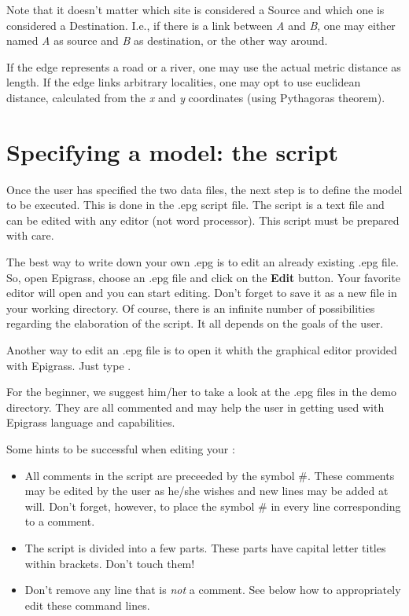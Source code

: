 \documentclass[a4paper,10pt]{manual}
\begin{document}
Note that it doesn't matter which site is considered a Source and which one is considered a Destination. I.e., if there is a link between \emph{A} and \emph{B}, one may either named \emph{A} as source and \emph{B} as destination, or the other way around.

If the edge represents a road or a river, one may use the actual metric distance as length. If the edge links arbitrary localities, one may opt to use euclidean distance, calculated from the \emph{x} and \emph{y} coordinates (using Pythagoras theorem).


\section{Specifying a model: the script}

Once the user has specified the two data files, the next step is to define the model to be executed. This is done in the .epg script file. The    script is a text file and can be edited with any editor (not word processor). This script must be prepared with care.

The best way to write down your own .epg is to edit an already existing .epg file. So, open Epigrass, choose an .epg file and click on the \textbf{Edit} button. Your favorite editor will open and you can start editing. Don't forget to save it as a new file in your working directory. Of course, there is an infinite number of possibilities regarding the elaboration of the script. It all depends on the goals of the user.

\begin{notice}[note]
Another way to edit an .epg file is to open it whith the graphical editor provided with Epigrass. Just type .
\end{notice}

For the beginner, we suggest him/her to take a look at the .epg files in the demo directory. They are all commented and may help the user in getting used with Epigrass language and capabilities.

Some hints to be successful when editing your   :
\begin{itemize}
\item {} 
All comments in the script are preceeded by the symbol \#. These comments may be edited by the user as he/she wishes and new lines may be added at will. Don't forget, however, to place the symbol \# in every line corresponding to a comment.

\item {} 
The script is divided into a few parts. These parts have capital letter titles within brackets. Don't touch them!

\item {} 
Don't remove any line that is \emph{not} a comment. See below how to appropriately edit these command lines.

\end{itemize}
\end{document}
